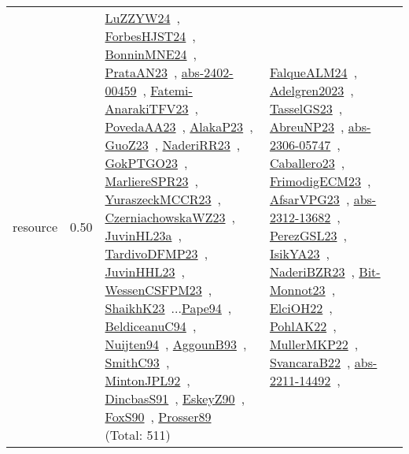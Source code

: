 {\begin{longtable}{p{3cm}r>{\raggedright\arraybackslash}p{6cm}>{\raggedright\arraybackslash}p{6cm}>{\raggedright\arraybackslash}p{8cm}}
\index{resource}\index{Scheduling!resource}resource &  0.50 & \href{../works/LuZZYW24.pdf}{LuZZYW24}~\cite{LuZZYW24}, \href{../works/ForbesHJST24.pdf}{ForbesHJST24}~\cite{ForbesHJST24}, \href{../works/BonninMNE24.pdf}{BonninMNE24}~\cite{BonninMNE24}, \href{../works/PrataAN23.pdf}{PrataAN23}~\cite{PrataAN23}, \href{../works/abs-2402-00459.pdf}{abs-2402-00459}~\cite{abs-2402-00459}, \href{../works/Fatemi-AnarakiTFV23.pdf}{Fatemi-AnarakiTFV23}~\cite{Fatemi-AnarakiTFV23}, \href{../works/PovedaAA23.pdf}{PovedaAA23}~\cite{PovedaAA23}, \href{../works/AlakaP23.pdf}{AlakaP23}~\cite{AlakaP23}, \href{../works/GuoZ23.pdf}{GuoZ23}~\cite{GuoZ23}, \href{../works/NaderiRR23.pdf}{NaderiRR23}~\cite{NaderiRR23}, \href{../works/GokPTGO23.pdf}{GokPTGO23}~\cite{GokPTGO23}, \href{../works/MarliereSPR23.pdf}{MarliereSPR23}~\cite{MarliereSPR23}, \href{../works/YuraszeckMCCR23.pdf}{YuraszeckMCCR23}~\cite{YuraszeckMCCR23}, \href{../works/CzerniachowskaWZ23.pdf}{CzerniachowskaWZ23}~\cite{CzerniachowskaWZ23}, \href{../works/JuvinHL23a.pdf}{JuvinHL23a}~\cite{JuvinHL23a}, \href{../works/TardivoDFMP23.pdf}{TardivoDFMP23}~\cite{TardivoDFMP23}, \href{../works/JuvinHHL23.pdf}{JuvinHHL23}~\cite{JuvinHHL23}, \href{../works/WessenCSFPM23.pdf}{WessenCSFPM23}~\cite{WessenCSFPM23}, \href{../works/ShaikhK23.pdf}{ShaikhK23}~\cite{ShaikhK23}...\href{../works/Pape94.pdf}{Pape94}~\cite{Pape94}, \href{../works/BeldiceanuC94.pdf}{BeldiceanuC94}~\cite{BeldiceanuC94}, \href{../works/Nuijten94.pdf}{Nuijten94}~\cite{Nuijten94}, \href{../works/AggounB93.pdf}{AggounB93}~\cite{AggounB93}, \href{../works/SmithC93.pdf}{SmithC93}~\cite{SmithC93}, \href{../works/MintonJPL92.pdf}{MintonJPL92}~\cite{MintonJPL92}, \href{../works/DincbasS91.pdf}{DincbasS91}~\cite{DincbasS91}, \href{../works/EskeyZ90.pdf}{EskeyZ90}~\cite{EskeyZ90}, \href{../works/FoxS90.pdf}{FoxS90}~\cite{FoxS90}, \href{../works/Prosser89.pdf}{Prosser89}~\cite{Prosser89} (Total: 511) & \href{../works/FalqueALM24.pdf}{FalqueALM24}~\cite{FalqueALM24}, \href{../works/Adelgren2023.pdf}{Adelgren2023}~\cite{Adelgren2023}, \href{../works/TasselGS23.pdf}{TasselGS23}~\cite{TasselGS23}, \href{../works/AbreuNP23.pdf}{AbreuNP23}~\cite{AbreuNP23}, \href{../works/abs-2306-05747.pdf}{abs-2306-05747}~\cite{abs-2306-05747}, \href{../works/Caballero23.pdf}{Caballero23}~\cite{Caballero23}, \href{../works/FrimodigECM23.pdf}{FrimodigECM23}~\cite{FrimodigECM23}, \href{../works/AfsarVPG23.pdf}{AfsarVPG23}~\cite{AfsarVPG23}, \href{../works/abs-2312-13682.pdf}{abs-2312-13682}~\cite{abs-2312-13682}, \href{../works/PerezGSL23.pdf}{PerezGSL23}~\cite{PerezGSL23}, \href{../works/IsikYA23.pdf}{IsikYA23}~\cite{IsikYA23}, \href{../works/NaderiBZR23.pdf}{NaderiBZR23}~\cite{NaderiBZR23}, \href{../works/Bit-Monnot23.pdf}{Bit-Monnot23}~\cite{Bit-Monnot23}, \href{../works/ElciOH22.pdf}{ElciOH22}~\cite{ElciOH22}, \href{../works/PohlAK22.pdf}{PohlAK22}~\cite{PohlAK22}, \href{../works/MullerMKP22.pdf}{MullerMKP22}~\cite{MullerMKP22}, \href{../works/SvancaraB22.pdf}{SvancaraB22}~\cite{SvancaraB22}, \href{../works/abs-2211-14492.pdf}{abs-2211-14492}~\cite{abs-2211-14492}, 
\end{longtable}}
